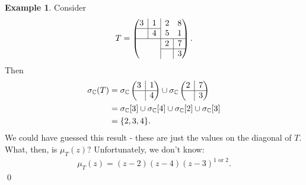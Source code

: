 \documentclass{article}
\theoremstyle{definition}
\newtheorem{exmp}{Example}[section]
\newcommand{\rvline}{\hspace*{-\arraycolsep}\vline\hspace*{-\arraycolsep}}
\begin{document}
\begin{exmp}
	Consider 
	\begin{align*}
	T = 
	\begin{pmatrix}
	\begin{matrix}
	3 & \rvline & 1\\
	\hline
	& \rvline & 4
	\end{matrix} 
	& \rvline &
	\begin{matrix}
	2 & 8 \\
	5 & 1
	\end{matrix}\\
	\hline
	&\rvline & 
	\begin{matrix}
	2 & \rvline & 7\\
	\hline
	& \rvline & 3
	\end{matrix}
	\end{pmatrix}.
	\end{align*}
	Then
	\begin{align*}
	\sigma_{\mathbb{C}}(T) 
	&= \sigma_{\mathbb{C}}
	\begin{pmatrix}
	3 & \rvline & 1\\
	\hline
	& \rvline & 4
	\end{pmatrix}  
	\cup
	\sigma_{\mathbb{C}}  
	\begin{pmatrix}
	2 & \rvline & 7\\
	\hline
	& \rvline & 3
	\end{pmatrix} \\
	&= \sigma_{\mathbb{C}}[3] \cup \sigma_{\mathbb{C}}[4] \cup \sigma_{\mathbb{C}}[2] \cup \sigma_{\mathbb{C}}[3]\\
	&= \{ 2,3,4 \}.    
	\end{align*}
	We could have guessed this result - these are just the values on the diagonal of $T$. What, then, is $\mu_T(z)$? Unfortunately, we don't know:
	\begin{align*}
	\mu_T(z) = (z-2)(z-4)(z-3)^{1\text{ or }2}.
	\end{align*}\qed
\end{exmp}
\end{document}

